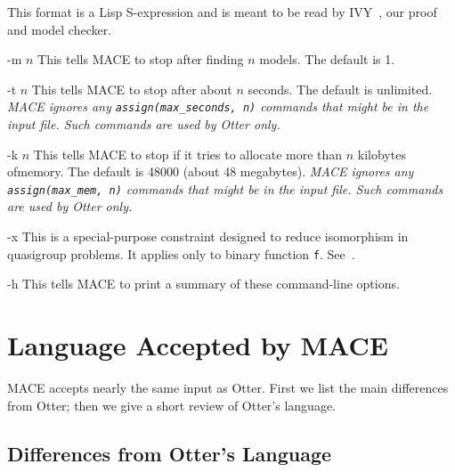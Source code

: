 \documentclass[11pt]{article}
\begin{document}
\begin{clo}
This format is a Lisp S-expression and is meant to be read
by IVY~\cite{ivy}, our proof and model checker.
\item[-m $n$]
This tells MACE to stop after finding $n$ models.  The default is 1.
\item[-t $n$]
This tells MACE to stop after about $n$ seconds.  The default is unlimited.
\emph{MACE ignores any \texttt{assign(max\_seconds, n)} commands
that might be in the input file.  Such commands are used by Otter only.}
\item[-k $n$]
This tells MACE to stop if it tries to allocate more than $n$
kilobytes ofmemory. The default is 48000 (about 48 megabytes).
\emph{MACE ignores any \texttt{assign(max\_mem, n)} commands
that might be in the input file.  Such commands are used by Otter only.}
\item[-x]
This is a special-purpose constraint designed to reduce
isomorphism in quasigroup problems.
It applies only to binary function \texttt{f}.
See~\cite{dp-quasi}.
\item[-h]
This tells MACE to print a summary of these command-line options.
\end{clo}

\section{Language Accepted by MACE} \label{language}

MACE accepts nearly the same input as Otter.
First we list the main differences from Otter; then we give a short
review of Otter's language.

\subsection{Differences from Otter's Language}
\end{document}
